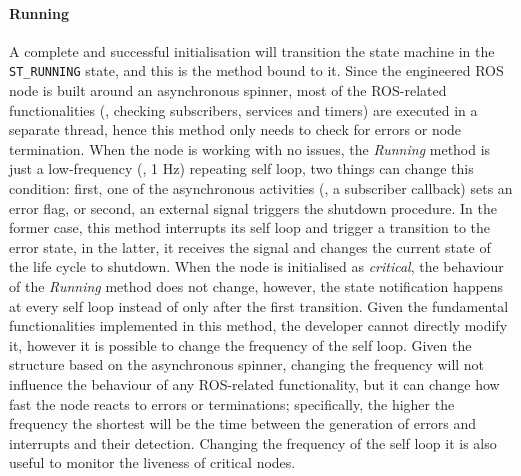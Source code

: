 \paragraph{Running} A complete and successful initialisation will transition the state machine in the \texttt{ST\_RUNNING} state, and this is the method bound to it. Since the engineered ROS node is built around an asynchronous spinner, most of the ROS-related functionalities (\ie, checking subscribers, services and timers) are executed in a separate thread, hence this method only needs to check for errors or node termination. When the node is working with no issues, the \textit{Running} method is just a low-frequency (\ie, 1 Hz) repeating self loop, two things can change this condition: first, one of the asynchronous activities (\eg, a subscriber callback) sets an error flag, or second, an external signal triggers the shutdown procedure. In the former case, this method interrupts its self loop and trigger a transition to the error state, in the latter, it receives the signal and changes the current state of the life cycle to shutdown. When the node is initialised as \textit{critical}, the behaviour of the \textit{Running} method does not change, however, the state notification happens at every self loop instead of only after the first transition. Given the fundamental functionalities implemented in this method, the developer cannot directly modify it, however it is possible to change the frequency of the self loop. Given the structure based on the asynchronous spinner, changing the frequency will not influence the behaviour of any ROS-related functionality, but it can change how fast the node reacts to errors or terminations; specifically, the higher the frequency the shortest will be the time between the generation of errors and interrupts and their detection. Changing the frequency of the self loop it is also useful to monitor the liveness of critical nodes. 

